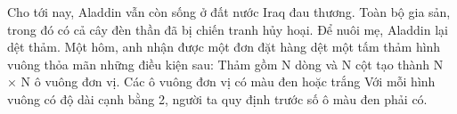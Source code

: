Cho tới nay, Aladdin vẫn còn sống ở đất nước Iraq đau thương. Toàn bộ gia sản, trong đó có cả cây đèn thần đã bị chiến tranh hủy hoại. Để nuôi mẹ, Aladdin lại dệt thảm. Một hôm, anh nhận được một đơn đặt hàng dệt một tấm thảm hình vuông thỏa mãn những điều kiện sau:  Thảm gồm N dòng và N cột tạo thành N × N ô vuông đơn vị. Các ô vuông đơn vị có màu đen hoặc trắng  Với mỗi hình vuông có độ dài cạnh bằng 2, người ta quy định trước số ô màu đen phải có.  

\